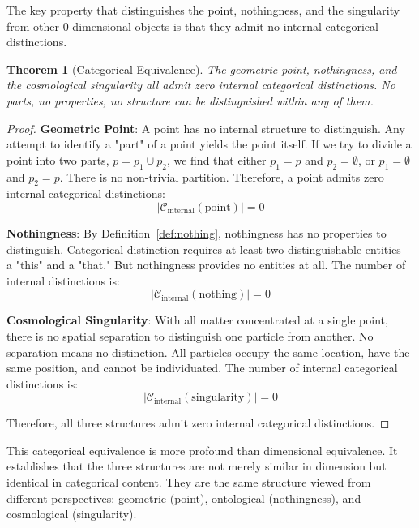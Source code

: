 \documentclass[12pt,a4paper]{article}
\newtheorem{theorem}{Theorem}[section]
\theoremstyle{definition}
\theoremstyle{remark}
\begin{document}
The key property that distinguishes the point, nothingness, and the singularity from other 0-dimensional objects is that they admit no internal categorical distinctions.

\begin{theorem}[Categorical Equivalence]
\label{thm:categorical_equiv}
The geometric point, nothingness, and the cosmological singularity all admit zero internal categorical distinctions. No parts, no properties, no structure can be distinguished within any of them.
\end{theorem}

\begin{proof}
\textbf{Geometric Point}: A point has no internal structure to distinguish. Any attempt to identify a "part" of a point yields the point itself. If we try to divide a point into two parts, $p = p_1 \cup p_2$, we find that either $p_1 = p$ and $p_2 = \emptyset$, or $p_1 = \emptyset$ and $p_2 = p$. There is no non-trivial partition. Therefore, a point admits zero internal categorical distinctions:
\begin{equation}
|\mathcal{C}_{\text{internal}}(\text{point})| = 0
\end{equation}

\textbf{Nothingness}: By Definition~\ref{def:nothing}, nothingness has no properties to distinguish. Categorical distinction requires at least two distinguishable entities—a "this" and a "that." But nothingness provides no entities at all. The number of internal distinctions is:
\begin{equation}
|\mathcal{C}_{\text{internal}}(\text{nothing})| = 0
\end{equation}

\textbf{Cosmological Singularity}: With all matter concentrated at a single point, there is no spatial separation to distinguish one particle from another. No separation means no distinction. All particles occupy the same location, have the same position, and cannot be individuated. The number of internal categorical distinctions is:
\begin{equation}
|\mathcal{C}_{\text{internal}}(\text{singularity})| = 0
\end{equation}

Therefore, all three structures admit zero internal categorical distinctions.
\end{proof}

This categorical equivalence is more profound than dimensional equivalence. It establishes that the three structures are not merely similar in dimension but identical in categorical content. They are the same structure viewed from different perspectives: geometric (point), ontological (nothingness), and cosmological (singularity).
\end{document}
